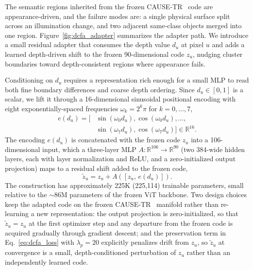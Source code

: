 \documentclass[10pt,twocolumn,letterpaper]{article}
\begin{document}
The semantic regions inherited from the frozen CAUSE-TR~\cite{kim2024cause} code are appearance-driven, and the failure modes are: a single physical surface split across an illumination change, and two adjacent same-class objects merged into one region. Figure~\ref{fig:dcfa_adapter} summarizes the adapter path. We introduce a small residual adapter that consumes the depth value $d_u$ at pixel $u$ and adds a learned depth-driven shift to the frozen 90-dimensional code $z_u$, nudging cluster boundaries toward depth-consistent regions where appearance fails.

Conditioning on $d_u$ requires a representation rich enough for a small MLP to read both fine boundary differences and coarse depth ordering. Since $d_u \in [0, 1]$ is a scalar, we lift it through a 16-dimensional sinusoidal positional encoding with eight exponentially-spaced frequencies $\omega_k = 2^k \pi$ for $k = 0, \dots, 7$,
\begin{equation}
\begin{aligned}
e(d_u) = \big[ &\sin(\omega_0 d_u), \cos(\omega_0 d_u), \dots, \\
              &\sin(\omega_7 d_u), \cos(\omega_7 d_u) \big] \in \mathbb{R}^{16}.
\end{aligned}
\label{eq:sinusoid}
\end{equation}
The encoding $e(d_u)$ is concatenated with the frozen code $z_u$ into a 106-dimensional input, which a three-layer MLP $A: \mathbb{R}^{106} \to \mathbb{R}^{90}$ (two 384-wide hidden layers, each with layer normalization and ReLU, and a zero-initialized output projection) maps to a residual shift added to the frozen code,
\begin{equation}
\tilde z_u = z_u + A([z_u,\, e(d_u)]).
\label{eq:residual}
\end{equation}
The construction has approximately 225K (225,114) trainable parameters, small relative to the $\sim$86M parameters of the frozen ViT backbone. Two design choices keep the adapted code on the frozen CAUSE-TR~\cite{kim2024cause} manifold rather than re-learning a new representation: the output projection is zero-initialized, so that $\tilde z_u = z_u$ at the first optimizer step and any departure from the frozen code is acquired gradually through gradient descent; and the preservation term in Eq.~\ref{eq:dcfa_loss} with $\lambda_p = 20$ explicitly penalizes drift from $z_u$, so $\tilde z_u$ at convergence is a small, depth-conditioned perturbation of $z_u$ rather than an independently learned code.
\end{document}
